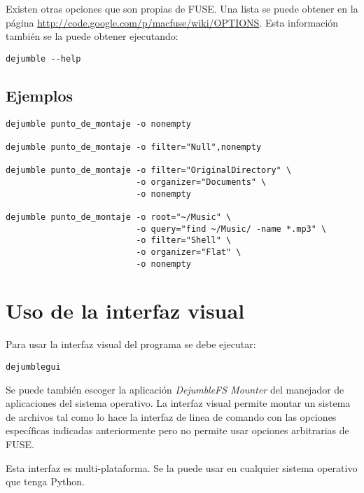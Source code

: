 Existen otras opciones que son propias de FUSE. Una lista se puede obtener en la página \url{http://code.google.com/p/macfuse/wiki/OPTIONS}. Esta información también se la puede obtener ejecutando:

\begin{verbatim}
dejumble --help
\end{verbatim}

\subsection{Ejemplos}

\begin{verbatim}
dejumble punto_de_montaje -o nonempty

dejumble punto_de_montaje -o filter="Null",nonempty

dejumble punto_de_montaje -o filter="OriginalDirectory" \
                          -o organizer="Documents" \
                          -o nonempty

dejumble punto_de_montaje -o root="~/Music" \
                          -o query="find ~/Music/ -name *.mp3" \
                          -o filter="Shell" \
                          -o organizer="Flat" \
                          -o nonempty
\end{verbatim}


\section{Uso de la interfaz visual}

Para usar la interfaz visual del programa se debe ejecutar:

\begin{verbatim}
dejumblegui
\end{verbatim}

Se puede también escoger la aplicación \textit{DejumbleFS Mounter} del manejador de aplicaciones del sistema operativo. La interfaz visual permite montar un sistema de archivos tal como lo hace la interfaz de linea de comando con las opciones específicas indicadas anteriormente pero no permite usar opciones arbitrarias de FUSE.


Esta interfaz es multi-plataforma. Se la puede usar en cualquier sistema operativo que tenga Python.


